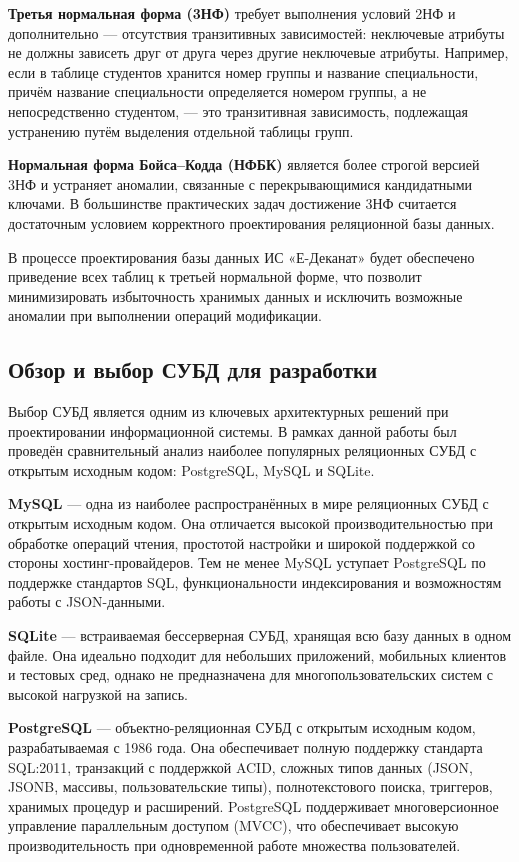 \documentclass[14pt, a4paper]{extreport}
\begin{document}
\textbf{Третья нормальная форма (3НФ)} требует выполнения условий 2НФ и дополнительно --- отсутствия транзитивных зависимостей: неключевые атрибуты не должны зависеть друг от друга через другие неключевые атрибуты. Например, если в таблице студентов хранится номер группы и название специальности, причём название специальности определяется номером группы, а не непосредственно студентом, --- это транзитивная зависимость, подлежащая устранению путём выделения отдельной таблицы групп.

\textbf{Нормальная форма Бойса--Кодда (НФБК)} является более строгой версией 3НФ и устраняет аномалии, связанные с перекрывающимися кандидатными ключами. В большинстве практических задач достижение 3НФ считается достаточным условием корректного проектирования реляционной базы данных.

В процессе проектирования базы данных ИС «Е-Деканат» будет обеспечено приведение всех таблиц к третьей нормальной форме, что позволит минимизировать избыточность хранимых данных и исключить возможные аномалии при выполнении операций модификации.

\subsection{Обзор и выбор СУБД для разработки}
Выбор СУБД является одним из ключевых архитектурных решений при проектировании информационной системы. В рамках данной работы был проведён сравнительный анализ наиболее популярных реляционных СУБД с открытым исходным кодом: PostgreSQL, MySQL и SQLite.

\textbf{MySQL} --- одна из наиболее распространённых в мире реляционных СУБД с открытым исходным кодом. Она отличается высокой производительностью при обработке операций чтения, простотой настройки и широкой поддержкой со стороны хостинг-провайдеров. Тем не менее MySQL уступает PostgreSQL по поддержке стандартов SQL, функциональности индексирования и возможностям работы с JSON-данными.

\textbf{SQLite} --- встраиваемая бессерверная СУБД, хранящая всю базу данных в одном файле. Она идеально подходит для небольших приложений, мобильных клиентов и тестовых сред, однако не предназначена для многопользовательских систем с высокой нагрузкой на запись.

\textbf{PostgreSQL} --- объектно-реляционная СУБД с открытым исходным кодом, разрабатываемая с 1986 года. Она обеспечивает полную поддержку стандарта SQL:2011, транзакций с поддержкой ACID, сложных типов данных (JSON, JSONB, массивы, пользовательские типы), полнотекстового поиска, триггеров, хранимых процедур и расширений. PostgreSQL поддерживает многоверсионное управление параллельным доступом (MVCC), что обеспечивает высокую производительность при одновременной работе множества пользователей.
\end{document}

